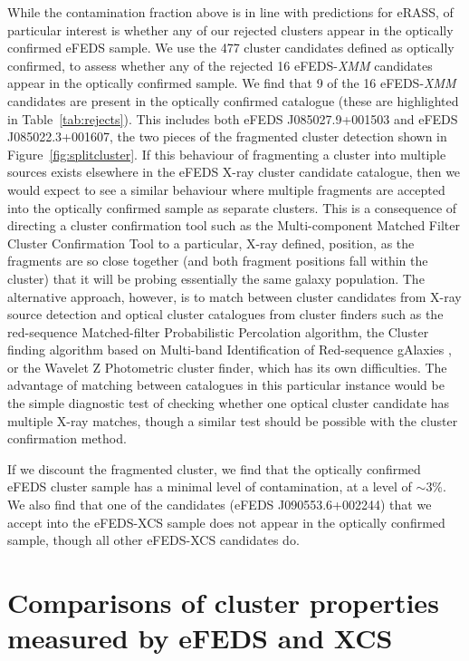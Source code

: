 \documentclass[fleqn,usenatbib]{mnras}
\begin{document}
While the contamination fraction above is in line with predictions for eRASS, of particular interest is whether any of our rejected clusters appear in the optically confirmed eFEDS sample.  We use the 477 cluster candidates \cite{efedsclusteropticalcat} defined as optically confirmed, to assess whether any of the rejected 16 eFEDS-{\em XMM} candidates appear in the optically confirmed sample.  We find that 9 of the 16 eFEDS-{\em XMM} candidates are present in the optically confirmed catalogue (these are highlighted in Table~\ref{tab:rejects}).  This includes both eFEDS J085027.9+001503 and eFEDS J085022.3+001607, the two pieces of the fragmented cluster detection shown in Figure~\ref{fig:splitcluster}.  If this behaviour of fragmenting a cluster into multiple sources exists elsewhere in the eFEDS X-ray cluster candidate catalogue, then we would expect to see a similar behaviour where multiple fragments are accepted into the optically confirmed sample as separate clusters. This is a consequence of directing a cluster confirmation tool such as the Multi-component Matched Filter Cluster Confirmation Tool \citep[MCMF,][]{MCMF} to a particular, X-ray defined, position, as the fragments are so close together (and both fragment positions fall within the cluster) that it will be probing essentially the same galaxy population. The alternative approach, however, is to match between cluster candidates from X-ray source detection and optical cluster catalogues from cluster finders such as the red-sequence Matched-filter Probabilistic Percolation \citep[redMaPPer,][]{redMaPPer} algorithm, the Cluster finding algorithm based on Multi-band Identification of Red-sequence gAlaxies \citep[CAMIRA,][]{camira}, or the Wavelet Z Photometric \citep[WaZP,][]{WaZP} cluster finder, which has its own difficulties. The advantage of matching between catalogues in this particular instance would be the simple diagnostic test of checking whether one optical cluster candidate has multiple X-ray matches, though a similar test should be possible with the cluster confirmation method. 

If we discount the fragmented cluster, we find that the optically confirmed eFEDS cluster sample has a minimal level of contamination, at a level of ${\sim}$3\%. We also find that one of the candidates (eFEDS J090553.6+002244) that we accept into the eFEDS-XCS sample does not appear in the optically confirmed sample, though all other eFEDS-XCS candidates do. 

\section{Comparisons of cluster properties measured by \lowercase{e}FEDS and XCS}
\label{sec:meascomp}
\end{document}
